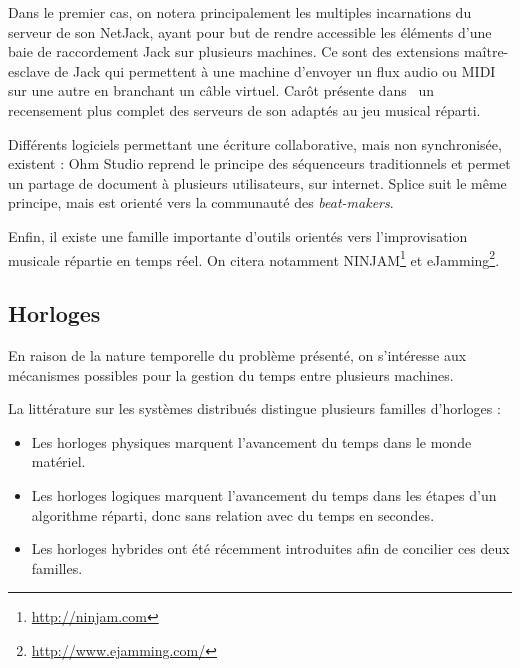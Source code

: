 \documentclass[10pt]{article}
\begin{document}
Dans le premier cas, on notera principalement les multiples incarnations du serveur de son NetJack\cite{carot2009netjack}, 
ayant pour but de rendre accessible les éléments d'une baie de raccordement Jack sur plusieurs machines. 
Ce sont des extensions maître-esclave de Jack qui permettent à une machine d'envoyer un flux audio ou MIDI sur une autre en branchant un câble virtuel.
Carôt présente dans~\cite{carot2007networked} un recensement plus complet des serveurs de son adaptés au jeu musical réparti.

Différents logiciels permettant une écriture collaborative, mais non synchronisée, existent : 
Ohm Studio\cite{koszolko2015crowdsourcing} reprend le principe des séquenceurs traditionnels et permet un partage de document à plusieurs utilisateurs, sur internet.
Splice\cite{pignato2015deterritorialized} suit le même principe, mais est orienté vers la communauté des \emph{beat-makers}.

Enfin, il existe une famille importante d'outils orientés vers l'improvisation musicale répartie en temps réel\cite{mills2010dislocated}. 
On citera notamment NINJAM\footnote{\url{http://ninjam.com}} et eJamming\footnote{\url{http://www.ejamming.com/}}.


\subsection{Horloges}
En raison de la nature temporelle du problème présenté, on s'intéresse aux mécanismes possibles pour la gestion du temps entre plusieurs machines.

La littérature sur les systèmes distribués distingue plusieurs familles d'horloges : 
\begin{itemize}
    \item Les horloges physiques marquent l'avancement du temps dans le monde matériel.
    \item Les horloges logiques marquent l'avancement du temps dans les étapes d'un algorithme réparti, donc sans relation avec du temps en secondes.
    \item Les horloges hybrides ont été récemment introduites afin de concilier ces deux familles.
\end{itemize}
\end{document}
